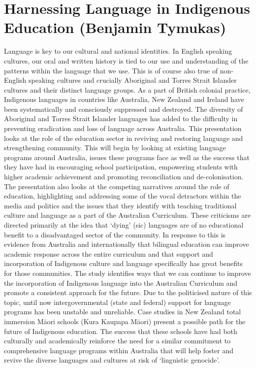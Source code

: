 \documentclass[twoside,12pt,a4paper,notitlepage]{memoir}
\begin{document}
\pagebreak
\section*{Harnessing Language in Indigenous Education (Benjamin Tymukas)}
\label{aut:tymukas}

Language is key to our cultural and national identities. In English speaking cultures, our oral and written history is tied to our use and understanding of the patterns within the language that we use. This is of course also true of non-English speaking cultures and crucially Aboriginal and Torres Strait Islander cultures and their distinct language groups. As a part of British colonial practice, Indigenous languages in countries like Australia, New Zealand and Ireland have been systematically and consciously suppressed and destroyed. The diversity of Aboriginal and Torres Strait Islander languages has added to the difficulty in preventing eradication and loss of language across Australia.
This presentation looks at the role of the education sector in reviving and restoring language and strengthening community. This will begin by looking at existing language programs around Australia, issues these programs face as well as the success that they have had in encouraging school participation, empowering students with higher academic achievement and promoting reconciliation and de-colonisation. The presentation also looks at the competing narratives around the role of education, highlighting and addressing some of the vocal detractors within the media and politics and the issues that they identify with teaching traditional culture and language as a part of the Australian Curriculum. These criticisms are directed primarily at the idea that ‘dying’ (sic) languages are of no educational benefit to a disadvantaged sector of the community. In response to this is evidence from Australia and internationally that bilingual education can improve academic response across the entire curriculum and that support and incorporation of Indigenous culture and language specifically has great benefits for those communities.
The study identifies ways that we can continue to improve the incorporation of Indigenous language into the Australian Curriculum and promote a consistent approach for the future. Due to the politicised nature of this topic, until now intergovernmental (state and federal) support for language programs has been unstable and unreliable. Case studies in New Zealand total immersion Māori schools (Kura Kaupapa Māori) present a possible path for the future of Indigenous education. The success that these schools have had both culturally and academically reinforce the need for a similar commitment to comprehensive language programs within Australia that will help foster and revive the diverse languages and cultures at risk of ‘linguistic genocide’.
\end{document}
